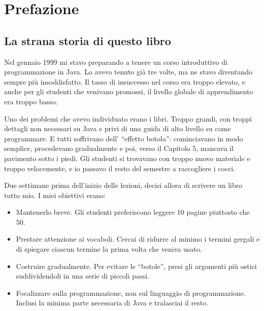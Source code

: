 \documentclass[10pt]{book}
\begin{document}
\fi


\chapter{Prefazione}

\section*{La strana storia di questo libro}

Nel gennaio 1999 mi stavo preparando a tenere un corso introduttivo di programmazione in Java. Lo avevo tenuto già tre volte, ma ne stavo diventando sempre più insoddisfatto. Il tasso di insuccesso nel corso era troppo elevato, e anche per gli studenti che venivano promossi, il livello globale di apprendimento era troppo basso.

Uno dei problemi che avevo individuato erano i libri. Troppo grandi, con troppi dettagli non necessari su Java e privi di una guida di alto livello su come programmare. E tutti soffrivano dell' ``effetto botola'': cominciavano in modo semplice, procedevano gradualmente e poi, verso il Capitolo 5, mancava il pavimento sotto i piedi. Gli studenti si trovavano con troppo nuovo materiale e troppo velocemente, e io passavo il resto del semestre a raccogliere i cocci.

Due settimane prima dell'inizio delle lezioni, decisi allora di scrivere un libro tutto mio. I miei obiettivi erano:

\begin{itemize}

\item Mantenerlo breve. Gli studenti preferiscono leggere 10 pagine piuttosto che 50.

\item Prestare attenzione ai vocaboli. Cercai di ridurre al minimo i termini gergali e di spiegare ciascun termine la prima volta che veniva usato.

\item Costruire gradualmente. Per evitare le ``botole'', presi gli argomenti più ostici suddividendoli in una serie di piccoli passi.

\item Focalizzare sulla programmazione, non sul linguaggio di programmazione. Inclusi la minima parte necessaria di Java e tralasciai il resto.

\end{itemize}
\end{document}
